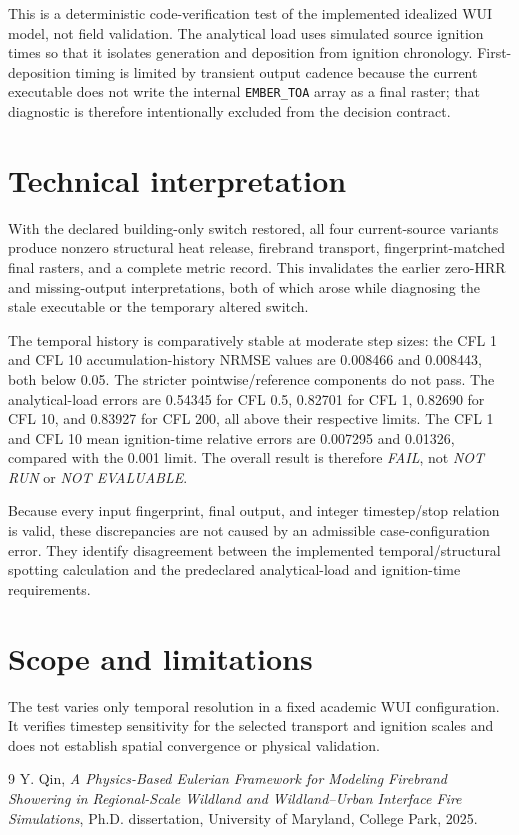 This is a deterministic code-verification test of the implemented idealized WUI
model, not field validation. The analytical load uses simulated source ignition
times so that it isolates generation and deposition from ignition chronology.
First-deposition timing is limited by transient output cadence because the
current executable does not write the internal \texttt{EMBER\_TOA} array as a
final raster; that diagnostic is therefore intentionally excluded from the
decision contract.

\section{Technical interpretation}
With the declared building-only switch restored, all four current-source variants produce nonzero structural heat release, firebrand transport, fingerprint-matched final rasters, and a complete metric record.  This invalidates the earlier zero-HRR and missing-output interpretations, both of which arose while diagnosing the stale executable or the temporary altered switch.

The temporal history is comparatively stable at moderate step sizes: the CFL 1 and CFL 10 accumulation-history NRMSE values are 0.008466 and 0.008443, both below 0.05.  The stricter pointwise/reference components do not pass.  The analytical-load errors are 0.54345 for CFL 0.5, 0.82701 for CFL 1, 0.82690 for CFL 10, and 0.83927 for CFL 200, all above their respective limits.  The CFL 1 and CFL 10 mean ignition-time relative errors are 0.007295 and 0.01326, compared with the 0.001 limit.  The overall result is therefore \emph{FAIL}, not \emph{NOT RUN} or \emph{NOT EVALUABLE}.

Because every input fingerprint, final output, and integer timestep/stop relation is valid, these discrepancies are not caused by an admissible case-configuration error.  They identify disagreement between the implemented temporal/structural spotting calculation and the predeclared analytical-load and ignition-time requirements.

\section{Scope and limitations}
The test varies only temporal resolution in a fixed academic WUI configuration. It verifies timestep sensitivity for the selected transport and ignition scales and does not establish spatial convergence or physical validation.

\begin{thebibliography}{9}
Y. Qin, \emph{A Physics-Based Eulerian Framework for Modeling Firebrand
Showering in Regional-Scale Wildland and Wildland--Urban Interface Fire
Simulations}, Ph.D. dissertation, University of Maryland, College Park, 2025.
\end{thebibliography}
